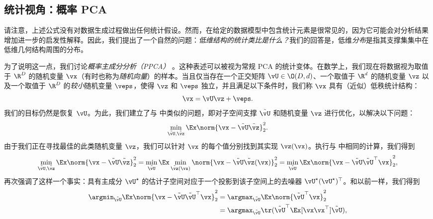 \documentclass[../../book-main_zh.tex]{subfiles}
\begin{document}
\subsection{统计视角：概率 PCA}\label{subsec:probabilistic PCA}

请注意，上述公式没有对数据生成过程做出任何统计假设。然而，在给定的数据模型中包含统计元素是很常见的，因为它可能会对分析结果增加进一步的启发性解释。因此，我们提出了一个自然的问题：\textit{低维结构的统计类比是什么？}我们的回答是，低维\textit{分布}是指其支撑集集中在低维几何结构周围的分布。

为了说明这一点，我们讨论\textit{概率主成分分析（PPCA）} \citep{TippingM1999}。这种表述可以被视为常规
PCA 的统计变体。在数学上，我们现在将数据视为取值于 \(\R^{D}\) 的随机变量
\(\vx\)（有时也称为\textit{随机向量}）的样本。当且仅当存在一个正交矩阵 \(\vU \in \O(D,
d)\)、一个取值于 \(\R^{d}\) 的随机变量 \(\vz\) 以及一个取值于 \(\R^{D}\)
的\textit{较小}随机变量 \(\veps\)，使得 \(\vz\) 和 \(\veps\) 独立，并且满足以下条件时，我们称
\(\vx\) 具有（近似）低秩统计结构：
\begin{equation}
    \vx = \vU\vz + \veps.
\end{equation}
我们的目标仍然是恢复 \(\vU\)。为此，我们建立了与  中类似的问题，即对子空间支撑
\(\tilde{\vU}\) 和随机变量 \(\vz\) 进行优化，以解决以下问题：
\begin{equation}
    \min_{\tilde{\vU}, \tilde{\vz}}\Ex\norm{\vx -
    \tilde{\vU}\tilde{\vz}}_{2}^{2}.
\end{equation}
由于我们正在寻找最佳的此类随机变量 \(\vz\)，我们可以针对 \(\vx\) 的每个值分别找到其实现 \(\vz(\vx)\)。执行与
 中相同的计算，我们得到 %
\begin{equation}\label{eq:ppca_denoising}
    \min_{\tilde{\vU}, \tilde{\vz}}\Ex\norm{\vx -
    \tilde{\vU}\tilde{\vz}}_{2}^{2} =
    \min_{\tilde{\vU}}\Ex\min_{\tilde{\vz}(\vx)}\norm{\vx -
    \tilde{\vU}\tilde{\vz}(\vx)}_{2}^{2} =
    \min_{\tilde{\vU}}\Ex\norm{\vx - \tilde{\vU}\tilde{\vU}^{\top}\vx}_{2}^{2},
\end{equation}
再次强调了这样一个事实：具有主成分 \(\vU^{\star}\) 的估计子空间对应于一个投影到该子空间上的去噪器
\(\vU^{\star}(\vU^{\star})^{\top}\)。和以前一样，我们得到
\begin{align}\label{eq:PPCA}
    \argmin_{\tilde{\vU}}\Ex\norm{\vx -
    \tilde{\vU}\tilde{\vU}^{\top}\vx}_{2}^{2}
    &= \argmax_{\tilde{\vU}}\Ex\norm{\tilde{\vU}^{\top}\vx}_{2}^{2} \\
    &=
    \argmax_{\tilde{\vU}}\tr(\tilde{\vU}^{\top}\Ex[\vx\vx^{\top}]\tilde{\vU}),
\end{align}
\end{document}
